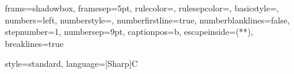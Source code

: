 \graphicspath{{figures/}{../figures/}}

\usepackage{color}


\lstset %
{
	frame=shadowbox,
	framesep=5pt,
	rulecolor=\color{blue!40!black},
	rulesepcolor=\color{white!93!black},
	basicstyle=\ttfamily\normalsize,
	numbers=left,
	numberstyle=\tiny,
	numberfirstline=true,
	numberblanklines=false,
	stepnumber=1,
	numbersep=9pt,	
	captionpos=b,
	escapeinside={(*}{*)},
	breaklines=true
}

{
	style=standard,
	language=[Sharp]C
}

\usetikzlibrary{shapes,arrows,external,petri}	